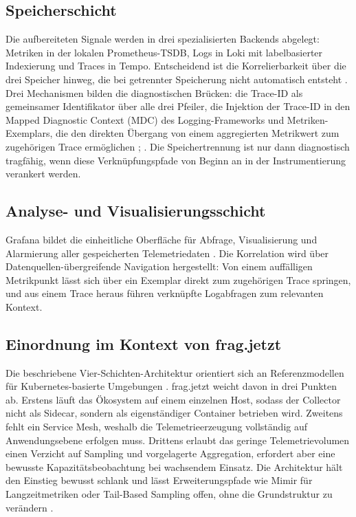  
\subsection{Speicherschicht}
 
Die aufbereiteten Signale werden in drei spezialisierten Backends abgelegt: Metriken in der lokalen Prometheus-TSDB, Logs in Loki mit labelbasierter Indexierung und Traces in Tempo. Entscheidend ist die Korrelierbarkeit über die drei Speicher hinweg, die bei getrennter Speicherung nicht automatisch entsteht \parencite[S.~44]{bissig2024unified}. Drei Mechanismen bilden die diagnostischen Brücken: die Trace-ID als gemeinsamer Identifikator über alle drei Pfeiler, die Injektion der Trace-ID in den Mapped Diagnostic Context (MDC) des Logging-Frameworks \parencite[S.~20]{sundstrom2025finding} und Metriken-Exemplars, die den direkten Übergang von einem aggregierten Metrikwert zum zugehörigen Trace ermöglichen \parencite[S.~25]{bissig2024unified}; \parencite[S.~12]{albuquerque2025tracing}. Die Speichertrennung ist nur dann diagnostisch tragfähig, wenn diese Verknüpfungspfade von Beginn an in der Instrumentierung verankert werden.
 
 
\subsection{Analyse- und Visualisierungsschicht}
 
Grafana bildet die einheitliche Oberfläche für Abfrage, Visualisierung und Alarmierung aller gespeicherten Telemetriedaten \parencite[S.~16]{sundstrom2025finding}. Die Korrelation wird über Datenquellen-übergreifende Navigation hergestellt: Von einem auffälligen Metrikpunkt lässt sich über ein Exemplar direkt zum zugehörigen Trace springen, und aus einem Trace heraus führen verknüpfte Logabfragen zum relevanten Kontext.
 
 
\subsection{Einordnung im Kontext von frag.jetzt}
 
Die beschriebene Vier-Schichten-Architektur orientiert sich an Referenzmodellen für Kubernetes-basierte Umgebungen \parencite[S.~501]{gudimetla2025transitioning}. frag.jetzt weicht davon in drei Punkten ab. Erstens läuft das Ökosystem auf einem einzelnen Host, sodass der Collector nicht als Sidecar, sondern als eigenständiger Container betrieben wird. Zweitens fehlt ein Service Mesh, weshalb die Telemetrieerzeugung vollständig auf Anwendungsebene erfolgen muss. Drittens erlaubt das geringe Telemetrievolumen einen Verzicht auf Sampling und vorgelagerte Aggregation, erfordert aber eine bewusste Kapazitätsbeobachtung bei wachsendem Einsatz. Die Architektur hält den Einstieg bewusst schlank und lässt Erweiterungspfade wie Mimir für Langzeitmetriken oder Tail-Based Sampling offen, ohne die Grundstruktur zu verändern \parencite[S.~1--2]{borges2024informed}.
 
